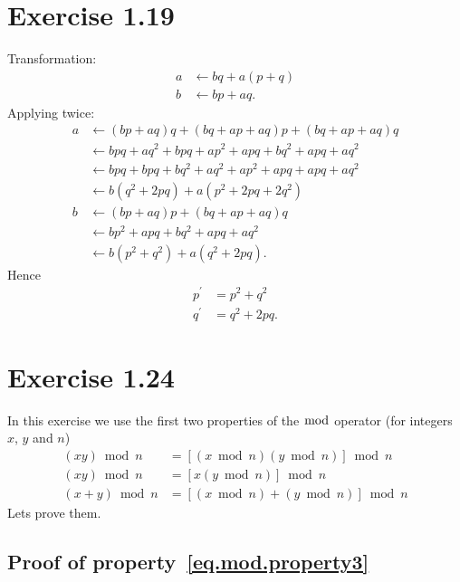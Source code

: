 \documentclass[12pt,a4paper]{article}
\begin{document}
\section{Exercise 1.19}

Transformation:
\begin{align*}
  a &\leftarrow bq + a(p + q) \\
  b &\leftarrow bp + aq.
\end{align*}
Applying twice:
\begin{align*}
  a
  &\leftarrow (bp + aq)q + (bq + ap + aq)p + (bq + ap + aq)q \\
  &\leftarrow bpq + aq^2 + bpq + ap^2 + apq + bq^2 + apq + aq^2 \\
  &\leftarrow bpq + bpq + bq^2 + aq^2  + ap^2 + apq + apq + aq^2 \\
  &\leftarrow b(q^2 + 2pq) + a(p^2 + 2pq + 2q^2) \\
  b
  &\leftarrow (bp + aq)p + (bq + ap + aq)q \\
  &\leftarrow bp^2 + apq + bq^2 + apq + aq^2 \\
  &\leftarrow b(p^2 + q^2) + a(q^2 + 2pq).
\end{align*}
Hence
\begin{align*}
  p^{'} &= p^2 + q^2 \\
  q^{'} &= q^2 + 2pq.
\end{align*}

\section{Exercise 1.24}

In this exercise we use the first two properties of the $\bmod$ operator (for integers
$x$, $y$ and $n$)
\begin{align}
  (xy)\bmod n &= [(x\bmod n)(y\bmod n)]\bmod n \label{eq.mod.property1} \\
  (xy)\bmod n &= [x(y\bmod n)]\bmod n \label{eq.mod.property2} \\
  (x + y)\bmod n &= [(x\bmod n) + (y\bmod n)]\bmod n \label{eq.mod.property3}
\end{align}
Lets prove them.

\subsection{Proof of property~\eqref{eq.mod.property3}}
\end{document}
